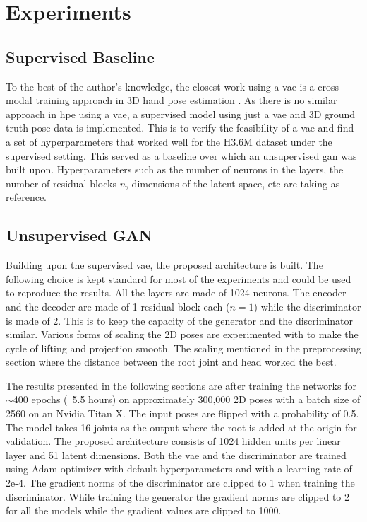 \chapter{Experiments}
\label{chap:experiments}

\section{Supervised Baseline}
To the best of the author's knowledge, the closest work using a \ac{vae} is a cross-modal training approach in 3D hand pose estimation \cite{crossmodal}. As there is no similar approach in \ac{hpe} using a \ac{vae}, a supervised model using just a \ac{vae} and 3D ground truth pose data is implemented. This is to verify the feasibility of a \ac{vae} and find a set of hyperparameters that worked well for the H3.6M dataset under the supervised setting. This served as a baseline over which an unsupervised \ac{gan} was built upon. Hyperparameters such as the number of neurons in the layers, the number of residual blocks $n$, dimensions of the latent space, etc are taking as reference.

\section{Unsupervised GAN}
Building upon the supervised \ac{vae}, the proposed architecture is built. The following choice is kept standard for most of the experiments and could be used to reproduce the results. All the layers are made of 1024 neurons. The encoder and the decoder are made of 1 residual block each ($n = 1$) while the discriminator is made of 2. This is to keep the capacity of the generator and the discriminator similar. Various forms of scaling the 2D poses are experimented with to make the cycle of lifting and projection smooth. The scaling mentioned in the preprocessing section where the distance between the root joint and head worked the best. %

The results presented in the following sections are after training the networks for $\sim$400 epochs (~5.5 hours) on approximately 300,000 2D poses with a batch size of 2560 on an Nvidia Titan X. The input poses are flipped with a probability of 0.5. The model takes 16 joints as the output where the root is added at the origin for validation. The proposed architecture consists of 1024 hidden units per linear layer and 51 latent dimensions. Both the \ac{vae} and the discriminator are trained using Adam optimizer with default hyperparameters and with a learning rate of 2e-4. The gradient norms of the discriminator are clipped to 1 when training the discriminator. While training the generator the gradient norms are clipped to 2 for all the models while the gradient values are clipped to 1000.

